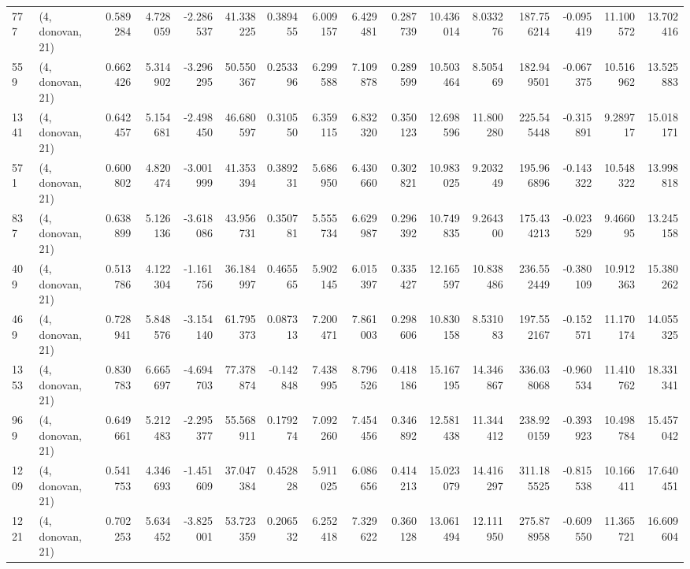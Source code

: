 \begin{tabular}{llrrrrrrrrrrrrrr}
777  &  (4, donovan, 21) &   0.589284 &   4.728059 &  -2.286537 &     41.338225 &    0.389455 &    6.009157 &    6.429481 &  0.287739 &  10.436014 &   8.033276 &   187.756214 &  -0.095419 &  11.100572 &  13.702416 \\
559  &  (4, donovan, 21) &   0.662426 &   5.314902 &  -3.296295 &     50.550367 &    0.253396 &    6.299588 &    7.109878 &  0.289599 &  10.503464 &   8.505469 &   182.949501 &  -0.067375 &  10.516962 &  13.525883 \\
1341 &  (4, donovan, 21) &   0.642457 &   5.154681 &  -2.498450 &     46.680597 &    0.310550 &    6.359115 &    6.832320 &  0.350123 &  12.698596 &  11.800280 &   225.545448 &  -0.315891 &   9.289717 &  15.018171 \\
571  &  (4, donovan, 21) &   0.600802 &   4.820474 &  -3.001999 &     41.353394 &    0.389231 &    5.686950 &    6.430660 &  0.302821 &  10.983025 &   9.203249 &   195.966896 &  -0.143322 &  10.548322 &  13.998818 \\
837  &  (4, donovan, 21) &   0.638899 &   5.126136 &  -3.618086 &     43.956731 &    0.350781 &    5.555734 &    6.629987 &  0.296392 &  10.749835 &   9.264300 &   175.434213 &  -0.023529 &   9.466095 &  13.245158 \\
409  &  (4, donovan, 21) &   0.513786 &   4.122304 &  -1.161756 &     36.184997 &    0.465565 &    5.902145 &    6.015397 &  0.335427 &  12.165597 &  10.838486 &   236.552449 &  -0.380109 &  10.912363 &  15.380262 \\
469  &  (4, donovan, 21) &   0.728941 &   5.848576 &  -3.154140 &     61.795373 &    0.087313 &    7.200471 &    7.861003 &  0.298606 &  10.830158 &   8.531083 &   197.552167 &  -0.152571 &  11.170174 &  14.055325 \\
1353 &  (4, donovan, 21) &   0.830783 &   6.665697 &  -4.694703 &     77.378874 &   -0.142848 &    7.438995 &    8.796526 &  0.418186 &  15.167195 &  14.346867 &   336.038068 &  -0.960534 &  11.410762 &  18.331341 \\
969  &  (4, donovan, 21) &   0.649661 &   5.212483 &  -2.295377 &     55.568911 &    0.179274 &    7.092260 &    7.454456 &  0.346892 &  12.581438 &  11.344412 &   238.920159 &  -0.393923 &  10.498784 &  15.457042 \\
1209 &  (4, donovan, 21) &   0.541753 &   4.346693 &  -1.451609 &     37.047384 &    0.452828 &    5.911025 &    6.086656 &  0.414213 &  15.023079 &  14.416297 &   311.185525 &  -0.815538 &  10.166411 &  17.640451 \\
1221 &  (4, donovan, 21) &   0.702253 &   5.634452 &  -3.825001 &     53.723359 &    0.206532 &    6.252418 &    7.329622 &  0.360128 &  13.061494 &  12.111950 &   275.878958 &  -0.609550 &  11.365721 &  16.609604 \\

\end{tabular}
